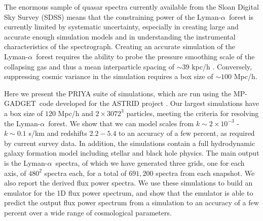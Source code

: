 \documentclass[a4paper,11pt]{article}
\newcommand{\Lya}{Lyman-$\alpha$}
\newcommand{\mpgadget}{{\small MP-GADGET}}
\begin{document}
The enormous sample of quasar spectra currently available from the Sloan Digital Sky Survey (SDSS) means that the constraining power of the \Lya~forest is currently limited by systematic uncertainty, especially in creating large and accurate enough simulation models and in understanding the instrumental characteristics of the spectrograph.
Creating an accurate simulation of the \Lya~forest requires the ability to probe the pressure smoothing scale of the collapsing gas and thus a mean interparticle spacing of $\sim 39$ kpc/h \cite{Borde:2014}.
 Conversely, suppressing cosmic variance in the simulation requires a box size of $\sim 100$ Mpc/h.

Here we present the PRIYA suite of simulations, which are run using the \mpgadget~code developed for the ASTRID project \cite{Ni:2021, Bird:2022}. Our largest simulations have a box size of $120$ Mpc/h and $2\times 3072^3$ particles, meeting the criteria for resolving the \Lya~forest.
We show that we can model scales from $k \sim 2\times 10^{-3}$ - $k \sim 0.1$ s/km and redshifts $2.2 - 5.4$ to an accuracy of a few percent, as required by current survey data. In addition, the simulations contain a full hydrodynamic galaxy formation model including stellar and black hole physics. The main output is the \Lya~spectra, of which we have generated three grids, one for each axis, of $480^2$ spectra each, for a total of $691,200$ spectra from each snapshot. We also report the derived flux power spectra.
We use these simulations to build an emulator for the 1D flux power spectrum, and show that the emulator is able to predict the output flux power spectrum from a simulation to an accuracy of a few percent over a wide range of cosmological parameters.
\end{document}
